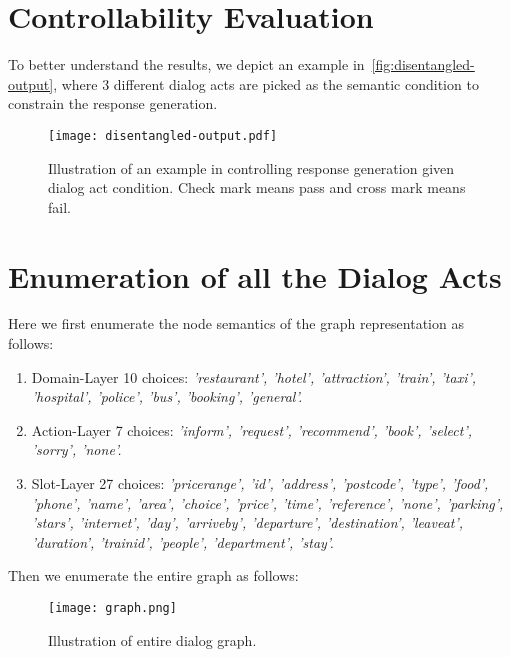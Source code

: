 \documentclass[11pt,a4paper]{article}
\begin{document}
\section{Controllability Evaluation}
To better understand the results, we depict an example in~\autoref{fig:disentangled-output}, where 3 different dialog acts are picked as the semantic condition to constrain the response generation. 
\begin{figure*}[thb]
    \begin{center}
    \texttt{[image: disentangled-output.pdf]}
    \end{center}
    \caption{Illustration of an example in controlling response generation given dialog act condition. Check mark means pass and cross mark means fail. }
    \label{fig:disentangled-output}
\end{figure*}
\section{Enumeration of all the Dialog Acts}
\label{sec:enumerate}
Here we first enumerate the node semantics of the graph representation as follows:
\begin{enumerate}
    \item Domain-Layer 10 choices: \textit{'restaurant', 'hotel', 'attraction', 'train', 'taxi', 'hospital', 'police', 'bus', 'booking', 'general'.}
    \item Action-Layer 7 choices: \textit{'inform', 'request', 'recommend', 'book', 'select', 'sorry', 'none'.}
    \item Slot-Layer 27 choices: \textit{'pricerange', 'id', 'address', 'postcode', 'type', 'food', 'phone', 'name', 'area', 'choice', 'price', 'time', 'reference', 'none', 'parking', 'stars', 'internet', 'day', 'arriveby', 'departure', 'destination', 'leaveat', 'duration', 'trainid', 'people', 'department', 'stay'.}
\end{enumerate}
Then we enumerate the entire graph as follows:
\begin{figure*}[htb]
\centering
    \texttt{[image: graph.png]}
    \caption{Illustration of entire dialog graph.}
    \label{fig:graph}
\end{figure*}
\end{document}
